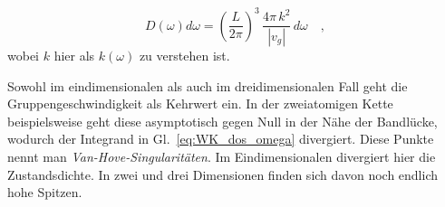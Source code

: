 \begin{equation}
D(\omega) d\omega = \left( \frac{L}{2 \pi} \right)^3 \,     \frac{ 4 \pi \, k^2 }{|v_g|}   \, d\omega  \quad ,
\end{equation} 
wobei $k$ hier als $k(\omega)$ zu verstehen ist.

Sowohl im eindimensionalen als auch im dreidimensionalen Fall geht die Gruppengeschwindigkeit als Kehrwert ein. In der zweiatomigen Kette beispielsweise geht diese asymptotisch gegen Null in der Nähe der Bandlücke, wodurch der Integrand in Gl.~\ref{eq:WK_dos_omega} divergiert. Diese Punkte nennt man \emph{Van-Hove-Singularitäten}. Im Eindimensionalen divergiert hier die Zustandsdichte. In zwei und drei Dimensionen finden sich davon noch endlich hohe Spitzen.








